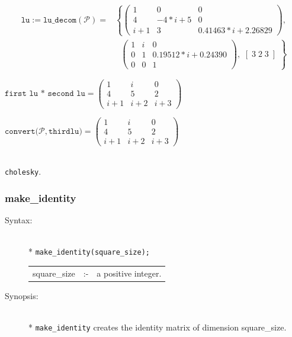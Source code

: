 {\begin{description}
\begin{align*}
\texttt{lu} := \texttt{lu}\_\texttt{decom}(\mathcal{P}) = &
\left\{
        \begin{pmatrix} 1 & 0 & 0 \\ 4 & -4*i+5 & 0 \\ i+1 &
3 & 0.41463*i+2.26829 \end{pmatrix}, \right. \nonumber \\ &
\left. \: \; \, \begin{pmatrix} 1 & i & 0 \\ 0 & 1 &
0.19512*i+0.24390 \\ 0 & 0 & 1 \end{pmatrix}, \,\,
[\; 3 \; 2 \; 3 \;] \,\,
\right\}
\end{align*}

\(\texttt{first lu * second lu} =
        \begin{pmatrix} 1 & i & 0 \\ 4 & 5 & 2 \\ i+1 & i+2 & i+3 \end{pmatrix}\)

\(\mathtt{convert(\mathcal{P},third lu}) =
        \begin{pmatrix} 1 & i & 0 \\ 4 & 5 & 2 \\ i+1 & i+2 & i+3 \end{pmatrix}\)

\item[Related functions:]\mbox{}\\
\texttt{cholesky}.
\end{description}


\subsubsection{make\_identity}
\label{linalg:make_identity}
\hypertarget{operator:MAKE_IDENTITY}{}

\begin{description}
\item[Syntax:]\mbox{}\\*
\texttt{make\_identity(square\_size);}\\[2mm]
\begin{tabular}{l l l}
square\_size &:-& a positive integer.
\end{tabular}

\item[Synopsis:]\mbox{}\\*
\texttt{make\_identity} creates the identity matrix of
                dimension square\_size.


\end{description}}
